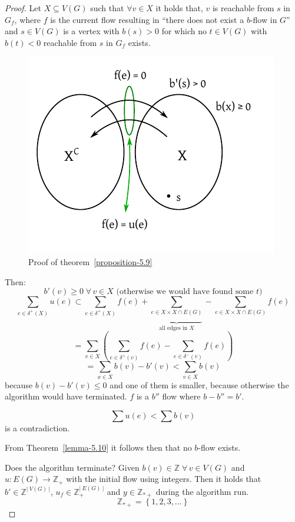 \documentclass{article}
\newcommand{\card}[1]{\left|\:\!#1\:\!\right|}
\newcommand{\set}[1]{\left\{#1\right\}}
\newcommand{\fall}{\;\forall\,}
\begin{document}
\begin{proof}
  Let $X \subseteq V(G)$ such that $\forall v \in X$ it holds that,
  $v$ is reachable from $s$ in $G_f$,
  where $f$ is the current flow resulting in ``there does not exist a $b$-flow in $G$''
  and $s \in V(G)$ is a vertex with $b(s) > 0$ for which no $t \in V(G)$ with $b(t) < 0$
  reachable from $s$ in $G_f$ exists.

  \begin{figure}[ht]
   \begin{center}
    \includegraphics{img/proposition_5_9_proof.pdf}
    \caption{Proof of theorem~\ref{proposition-5.9}}
   \end{center}
  \end{figure}

  Then:
  \[ b'(v) \geq 0 \fall v \in X \text{ (otherwise we would have found some $t$)} \]
  \[
    \sum_{e \in \delta^+(X)} u(e)
      \subset
        \sum_{e \in \delta^+(X)} f(e)
        + \underbrace{\sum_{e \in X \times{} X \cap E(G)}}_{\text{all edges in } X}
        - \sum_{e \in X \times{} X \cap E(G)} f(e)
  \] \[
    = \sum_{v \in X} \left(\sum_{e \in \delta^+(v)} f(e) - \sum_{e \in \delta^-(v)} f(e) \right)
  \] \[
    = \sum_{x \in X} b(v) - b'(v) < \sum_{v \in X} b(v)
  \]
  because $b(v) - b'(v) \leq 0$ and one of them is smaller, because otherwise the algorithm would have terminated.
  $f$ is a $b''$ flow where $b - b'' = b'$.

  \[ \sum u(e) < \sum b(v) \]
  is a contradiction.

  From Theorem~\ref{lemma-5.10} it follows then that no $b$-flow exists.

  Does the algorithm terminate?
  Given $b(v) \in \mathbb{Z} \fall v \in V(G)$ and $u: E(G) \rightarrow \mathbb{Z}_+$ with the initial flow using integers. Then it holds that $b' \in \mathbb{Z}^{\card{V(G)}}$, $u_f \in \mathbb{Z}_+^{\card{E(G)}}$ and $y \in \mathbb{Z}_{*+}$ during the algorithm run.
  \[ \mathbb{Z}_{*+} = \set{1, 2, 3, \ldots} \]


\end{proof}
\end{document}
